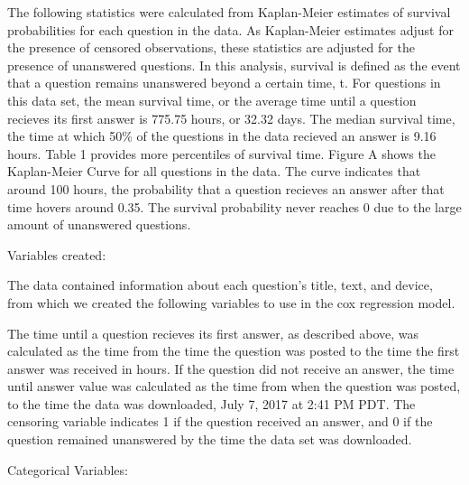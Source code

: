 \documentclass[12pt]{article}
\begin{document}
    The following statistics were calculated from Kaplan-Meier estimates of survival probabilities for each question in the data. As Kaplan-Meier estimates adjust for the presence of censored observations, these statistics are adjusted for the presence of unanswered questions. In this analysis, survival is defined as the event that a question remains unanswered beyond a certain time, t. For questions in this data set, the mean survival time, or the average time until a question recieves its first answer is 775.75 hours, or 32.32 days. The median survival time, the time at which 50\% of the questions in the data recieved an answer is 9.16 hours. Table 1 provides more percentiles of survival time. 
    Figure A shows the Kaplan-Meier Curve for all questions in the data. The curve indicates that around 100 hours, the probability that a question recieves an answer after that time hovers around 0.35. The survival probability never reaches 0 due to the large amount of unanswered questions. 
    
    Variables created: 
    
    The data contained information about each question's title, text, and device, from which we created the following variables to use in the cox regression model. 

The time until a question recieves its first answer, as described above, was calculated as the time from the time the question was posted to the time the first answer was received in hours. If the question did not receive an answer, the time until answer value was calculated as the time from when the question was posted, to the time the data was downloaded, July 7, 2017 at 2:41 PM PDT. The censoring variable indicates 1 if the question received an answer, and 0 if the question remained unanswered by the time the data set was downloaded.

Categorical Variables: 
\end{document}
